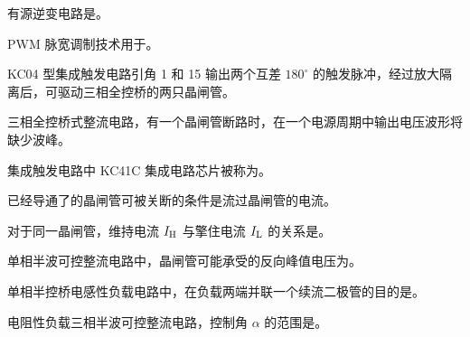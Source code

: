 \documentclass[电力电子]{subfiles}
\begin{document}
\begin{ti}
	有源逆变电路是。
\end{ti}

\begin{ti}
	PWM 脉宽调制技术用于。
\end{ti}

\begin{ti}
	KC04 型集成触发电路引角 1 和 15 输出两个互差 $180^\circ$ 的触发脉冲，经过放大隔离后，可驱动三相全控桥的两只晶闸管。
\end{ti}

\begin{ti}
	三相全控桥式整流电路，有一个晶闸管断路时，在一个电源周期中输出电压波形将缺少波峰。
\end{ti}

\begin{ti}
	集成触发电路中 KC41C 集成电路芯片被称为。
\end{ti}

\begin{ti}
	已经导通了的晶闸管可被关断的条件是流过晶闸管的电流。
\end{ti}

\begin{ti}
	对于同一晶闸管，维持电流 $I_{\mathrm{H}}$ 与擎住电流 $I_{\mathrm{L}}$ 的关系是。
\end{ti}

\begin{ti}
	单相半波可控整流电路中，晶闸管可能承受的反向峰值电压为。
\end{ti}

\begin{ti}
	单相半控桥电感性负载电路中，在负载两端并联一个续流二极管的目的是。
\end{ti}

\begin{ti}
	电阻性负载三相半波可控整流电路，控制角 $\alpha$ 的范围是。
\end{ti}
\end{document}
